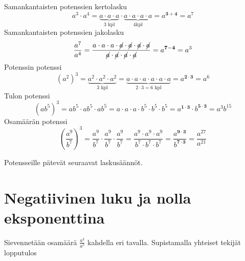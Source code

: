     Samankantaisten potenssien kertolasku
	\[
a^3\cdot a^4=\underbrace{a\cdot a\cdot a}_{\text{3 kpl}}\cdot \underbrace{a\cdot a\cdot a\cdot a}_{\text{4kpl}}=a^{\mathbf{3+4}}=a^7
    	\]
    Samankantaisten potenssien jakolasku
	\[
\frac{a^7}{a^4}=\frac{a\cdot a\cdot a\cdot \cancel{a}\cdot \cancel{a}\cdot \cancel{a}\cdot \cancel{a}}	{\cancel{a}\cdot \cancel{a}\cdot \cancel{a}\cdot \cancel{a}}=a^{\mathbf{7-4}}=a^3
    	\]
    Potenssin potenssi
	\[
(a^2)^3=\underbrace{a^2\cdot a^2\cdot a^2}_{3\text{ kpl}}=\underbrace{a\cdot a\cdot a\cdot a\cdot a\cdot a}_{2\cdot 3=6\text{ kpl}}=a^{\boldsymbol{{2\cdot 3}}}=a^6
\]
    Tulon potenssi
	\[
(ab^5)^3=ab^5\cdot ab^5\cdot ab^5=a\cdot a\cdot a\cdot b^5\cdot b^5\cdot b^5=a^{\mathbf{1\cdot 3}}\cdot b^{\mathbf{5\cdot 3}}=a^3b^{15}
	\]
     Osamäärän potenssi
	\[
	\left(\frac{a^9}{b^7}\right)^3=\frac{a^9}{b^7}\cdot \frac{a^9}{b^7}\cdot \frac{a^9}{b^7}=\frac{a^9\cdot a^9\cdot a^9}{b^7\cdot b^7\cdot b^7}=\frac{a^{\mathbf{9\cdot 3}}}{b^{\mathbf{7\cdot 3}}}=\frac{a^{27}}{a^{21}}
	\]

    Potensseille pätevät seuraavat laskusäännöt.
    
    
\section*{Negatiivinen luku ja nolla eksponenttina}
    
    Sievennetään osamäärä $\frac{a^3}{a^5}$ kahdella eri tavalla. Supistamalla yhteiset tekijät lopputulos
    
